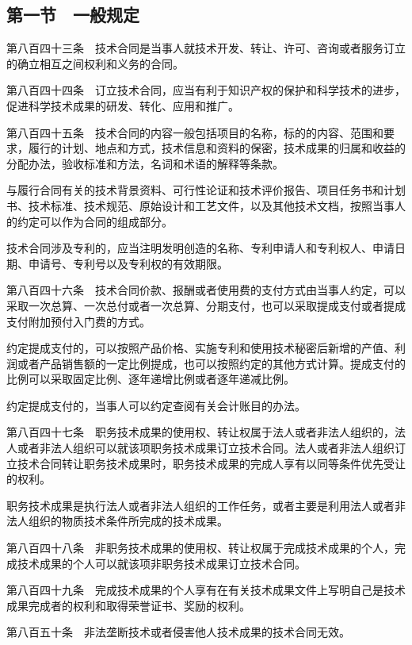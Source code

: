\documentclass[UTF8,12pt,a4paper]{ctexbook}
\begin{document}
\subsection*{第一节　一般规定}

第八百四十三条　技术合同是当事人就技术开发、转让、许可、咨询或者服务订立的确立相互之间权利和义务的合同。

第八百四十四条　订立技术合同，应当有利于知识产权的保护和科学技术的进步，促进科学技术成果的研发、转化、应用和推广。

第八百四十五条　技术合同的内容一般包括项目的名称，标的的内容、范围和要求，履行的计划、地点和方式，技术信息和资料的保密，技术成果的归属和收益的分配办法，验收标准和方法，名词和术语的解释等条款。

与履行合同有关的技术背景资料、可行性论证和技术评价报告、项目任务书和计划书、技术标准、技术规范、原始设计和工艺文件，以及其他技术文档，按照当事人的约定可以作为合同的组成部分。

技术合同涉及专利的，应当注明发明创造的名称、专利申请人和专利权人、申请日期、申请号、专利号以及专利权的有效期限。

第八百四十六条　技术合同价款、报酬或者使用费的支付方式由当事人约定，可以采取一次总算、一次总付或者一次总算、分期支付，也可以采取提成支付或者提成支付附加预付入门费的方式。

约定提成支付的，可以按照产品价格、实施专利和使用技术秘密后新增的产值、利润或者产品销售额的一定比例提成，也可以按照约定的其他方式计算。提成支付的比例可以采取固定比例、逐年递增比例或者逐年递减比例。

约定提成支付的，当事人可以约定查阅有关会计账目的办法。

第八百四十七条　职务技术成果的使用权、转让权属于法人或者非法人组织的，法人或者非法人组织可以就该项职务技术成果订立技术合同。法人或者非法人组织订立技术合同转让职务技术成果时，职务技术成果的完成人享有以同等条件优先受让的权利。

职务技术成果是执行法人或者非法人组织的工作任务，或者主要是利用法人或者非法人组织的物质技术条件所完成的技术成果。

第八百四十八条　非职务技术成果的使用权、转让权属于完成技术成果的个人，完成技术成果的个人可以就该项非职务技术成果订立技术合同。

第八百四十九条　完成技术成果的个人享有在有关技术成果文件上写明自己是技术成果完成者的权利和取得荣誉证书、奖励的权利。

第八百五十条　非法垄断技术或者侵害他人技术成果的技术合同无效。

\end{document}
